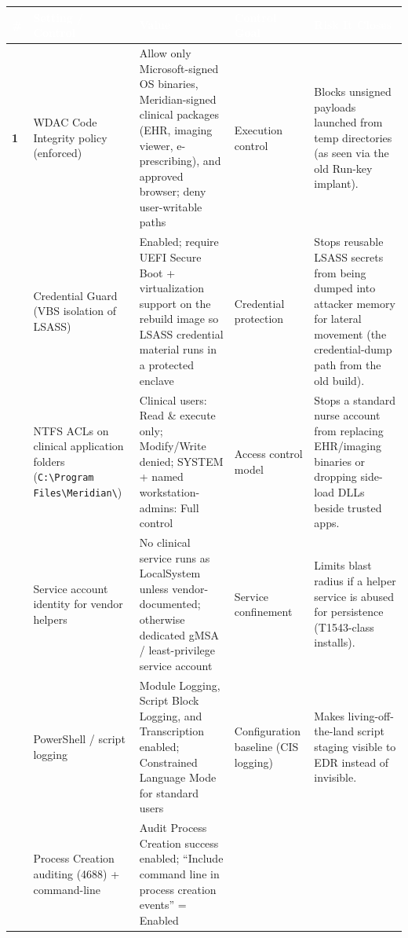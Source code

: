 \documentclass[11pt,letterpaper]{article}
\renewcommand{\arraystretch}{1.28}
\newcommand{\labtablesetup}{%
  \small
  \setlength{\tabcolsep}{6pt}%
  \renewcommand{\arraystretch}{1.45}%
}
\begin{document}
\begingroup\labtablesetup
{}
\begin{tabularx}{\textwidth}{@{}>{\bfseries\centering\arraybackslash}p{0.55cm} >{\RaggedRight\arraybackslash}p{2.35cm} >{\RaggedRight\arraybackslash}X >{\RaggedRight\arraybackslash}p{2.05cm} >{\RaggedRight\arraybackslash}X@{}}
\toprule
\rowcolor{tblhead}
\textcolor{white}{\textbf{\#}} &
\textcolor{white}{\textbf{Setting / Control}} &
\textcolor{white}{\textbf{Value}} &
\textcolor{white}{\textbf{Control Goal}} &
\textcolor{white}{\textbf{Risk It Closes}} \\
\midrule
\rowcolor{white}
1 & WDAC Code Integrity policy (enforced)
  & Allow only Microsoft-signed OS binaries, Meridian-signed clinical packages (EHR, imaging viewer, e-prescribing), and approved browser; deny user-writable paths
  & Execution control
  & Blocks unsigned payloads launched from temp directories (as seen via the old Run-key implant). \\
2 & Credential Guard (VBS isolation of LSASS)
  & Enabled; require UEFI Secure Boot + virtualization support on the rebuild image so LSASS credential material runs in a protected enclave
  & Credential protection
  & Stops reusable LSASS secrets from being dumped into attacker memory for lateral movement (the credential-dump path from the old build). \\
3 & NTFS ACLs on clinical application folders (\texttt{C:\textbackslash Program Files\textbackslash Meridian\textbackslash*})
  & Clinical users: Read \& execute only; Modify/Write denied; SYSTEM + named workstation-admins: Full control
  & Access control model
  & Stops a standard nurse account from replacing EHR/imaging binaries or dropping side-load DLLs beside trusted apps. \\
4 & Service account identity for vendor helpers
  & No clinical service runs as LocalSystem unless vendor-documented; otherwise dedicated gMSA / least-privilege service account
  & Service confinement
  & Limits blast radius if a helper service is abused for persistence (T1543-class installs). \\
5 & PowerShell / script logging
  & Module Logging, Script Block Logging, and Transcription enabled; Constrained Language Mode for standard users
  & Configuration baseline (CIS logging)
  & Makes living-off-the-land script staging visible to EDR instead of invisible. \\
6 & Process Creation auditing (4688) + command-line
  & Audit Process Creation success enabled; ``Include command line in process creation events'' = Enabled

\end{tabularx}
\end{document}
